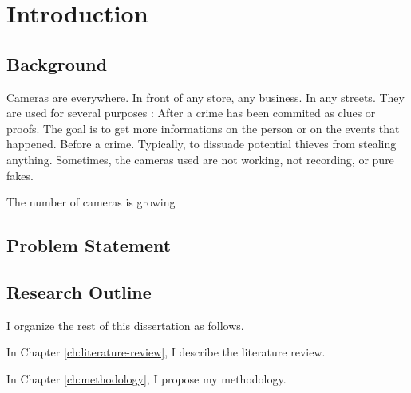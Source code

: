 \setlength{\footskip}{8mm}
\mainmatter
\chapter{Introduction}

\section{Background}


Cameras are everywhere. In front of any store, any business. In any streets. They are used for several purposes :
After a crime has been commited as clues or proofs. The goal is to get more informations on the person or on the events that happened. 
Before a crime. Typically, to dissuade potential thieves from stealing anything. Sometimes, the cameras used are not working, not recording, or pure fakes.

The number of cameras is growing

\section{Problem Statement}

\section{Research Outline}

I organize the rest of this dissertation as follows.

In Chapter \ref{ch:literature-review}, I describe the literature review.

In Chapter \ref{ch:methodology}, I propose my methodology.



\FloatBarrier

